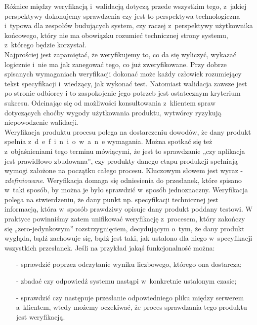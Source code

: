 \documentclass[brudnopis]{xmgr}
\begin{document}
 \textcolor{sb}{Różnice między weryfikacją i~walidacją dotyczą przede wszystkim tego, z~jakiej perspektywy dokonujemy sprawdzenia} \textcolor{sa}{czy jest to perspektywa technologiczna i~typowa dla zespołów budujących system, czy raczej z~perspektywy użytkownika końcowego, który nie ma obowiązku rozumieć technicznej strony systemu, z~którego będzie korzystał.}
\\
\indent \textcolor{sb}{Najprościej jest zapamiętać, że weryfikujemy to,} \textcolor{sa}{co da się wyliczyć, wykazać logicznie i~nie ma jak zanegować tego, co już zweryfikowane.} \textcolor{sb}{Przy dobrze spisanych wymaganiach} \textcolor{sa}{weryfikacji dokonać może każdy człowiek rozumiejący tekst specyfikacji i~wiedzący, jak wykonać test. }
\textcolor{sb}{Natomiast walidacja zawsze jest po stronie odbiorcy i} \textcolor{sa}{to zaspokojenie jego potrzeb jest ostatecznym kryterium sukcesu.} \textcolor{sb}{Odcinając się od możliwości konsultowania z~klientem spraw dotyczących choćby wygody użytkowania produktu,} \textcolor{sa}{wytwórcy ryzykują niepowodzenie walidacji.}
\\
\indent \textcolor{sb}{Weryfikacja produktu procesu} \textcolor{sa}{polega na dostarczeniu dowodów, że dany produkt spełnia z~d~e~f~i~n~i~o~w~a~n~e wymagania.} \textcolor{sb}{Można spotkać się też z~objaśnieniami tego terminu mówiącymi, że} \textcolor{sa}{jest to sprawdzanie „czy aplikacja jest prawidłowo zbudowana”, czy produkty danego etapu produkcji spełniają wymogi założone na początku całego procesu.}
\textcolor{sb}{Kluczowym słowem jest wyraz -  \textit{zdefiniowane}.} \textcolor{sa}{Weryfikacja domaga się odniesienia do przesłanek, które spisano w~taki sposób, by można je było sprawdzić w~sposób jednoznaczny.} \textcolor{sb}{Weryfikacja polega na stwierdzeniu, że dany punkt np. specyfikacji technicznej jest informacją,} \textcolor{sa}{która w~sposób prawdziwy opisuje dany produkt poddany testowi.} \textcolor{sb}{W praktyce powinniśmy zatem unifikować weryfikację z~procesem, który zakończy się „zero-jedynkowym” rozstrzygnięciem,} \textcolor{sa}{decydującym o~tym, że dany produkt wygląda, bądź zachowuje się, bądź jest taki, jak ustalono dla niego w~specyfikacji wszystkich przesłanek.} \textcolor{sb}{Jeśli na przykład jakąś funkcjonalność można:}
\begin{itemize}
  \item[-] \textcolor{sa}{sprawdzić poprzez odczytanie wyniku liczbowego, którego ona dostarcza; }
  \item[-] \textcolor{sa}{zbadać czy odpowiedź systemu nastąpi w~konkretnie ustalonym czasie;}
  \item[-] \textcolor{sa}{sprawdzić czy następuje przesłanie odpowiedniego pliku między serwerem a~klientem,
wtedy możemy oczekiwać, że proces sprawdzania tego produktu jest weryfikacją.}
\end{itemize}
\end{document}
